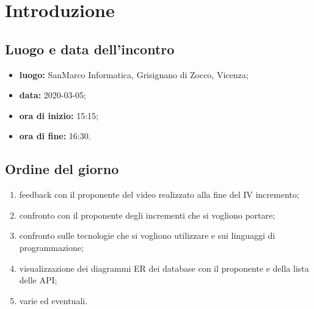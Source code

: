 \section*{Introduzione}

\subsection*{Luogo e data dell'incontro}
	\begin{itemize}
		\item \textbf{luogo:} SanMarco Informatica, Grisignano di Zocco, Vicenza;
		\item \textbf{data:} 2020-03-05;
		\item \textbf{ora di inizio:} 15:15;
		\item \textbf{ora di fine:} 16:30.
	\end{itemize}

\subsection*{Ordine del giorno}
	\begin{enumerate}
			\item feedback con il proponente del video realizzato alla fine del IV incremento;
  			\item confronto con il proponente degli incrementi che si vogliono portare;
  			\item confronto sulle tecnologie che si vogliono utilizzare e sui linguaggi di programmazione;
  			\item visualizzazione dei diagrammi ER dei database con il proponente e della lista delle API;
  			\item varie ed eventuali.
	\end{enumerate}

